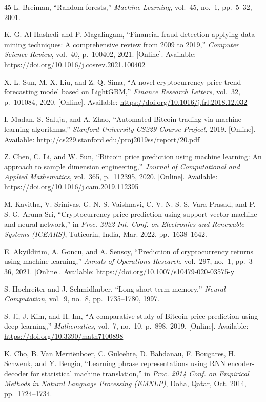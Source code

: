 \documentclass[conference]{IEEEtran}
\begin{document}
\begin{thebibliography}{45}
L. Breiman, ``Random forests,'' \textit{Machine Learning}, vol.~45, no.~1, pp.~5--32, 2001.

K. G. Al-Hashedi and P. Magalingam, ``Financial fraud detection applying data mining techniques: A comprehensive review from 2009 to 2019,'' \textit{Computer Science Review}, vol.~40, p.~100402, 2021. [Online]. Available: \url{https://doi.org/10.1016/j.cosrev.2021.100402}

X. L. Sun, M. X. Liu, and Z. Q. Sima, ``A novel cryptocurrency price trend forecasting model based on LightGBM,'' \textit{Finance Research Letters}, vol.~32, p.~101084, 2020. [Online]. Available: \url{https://doi.org/10.1016/j.frl.2018.12.032}

I. Madan, S. Saluja, and A. Zhao, ``Automated Bitcoin trading via machine learning algorithms,'' \textit{Stanford University CS229 Course Project}, 2019. [Online]. Available: \url{http://cs229.stanford.edu/proj2019ss/report/20.pdf}

Z. Chen, C. Li, and W. Sun, ``Bitcoin price prediction using machine learning: An approach to sample dimension engineering,'' \textit{Journal of Computational and Applied Mathematics}, vol.~365, p.~112395, 2020. [Online]. Available: \url{https://doi.org/10.1016/j.cam.2019.112395}

M. Kavitha, V. Srinivas, G. N. S. Vaishnavi, C. V. N. S. S. Vara Prasad, and P. S. G. Aruna Sri, ``Cryptocurrency price prediction using support vector machine and neural network,'' in \textit{Proc. 2022 Int. Conf. on Electronics and Renewable Systems (ICEARS)}, Tuticorin, India, Mar. 2022, pp.~1638--1642.

E. Akyildirim, A. Goncu, and A. Sensoy, ``Prediction of cryptocurrency returns using machine learning,'' \textit{Annals of Operations Research}, vol.~297, no.~1, pp.~3--36, 2021. [Online]. Available: \url{https://doi.org/10.1007/s10479-020-03575-y}

S. Hochreiter and J. Schmidhuber, ``Long short-term memory,'' \textit{Neural Computation}, vol.~9, no.~8, pp.~1735--1780, 1997.

S. Ji, J. Kim, and H. Im, ``A comparative study of Bitcoin price prediction using deep learning,'' \textit{Mathematics}, vol.~7, no.~10, p.~898, 2019. [Online]. Available: \url{https://doi.org/10.3390/math7100898}

K. Cho, B. Van Merri{\"e}nboer, C. Gulcehre, D. Bahdanau, F. Bougares, H. Schwenk, and Y. Bengio, ``Learning phrase representations using RNN encoder-decoder for statistical machine translation,'' in \textit{Proc. 2014 Conf. on Empirical Methods in Natural Language Processing (EMNLP)}, Doha, Qatar, Oct. 2014, pp.~1724--1734.


\end{thebibliography}
\end{document}
